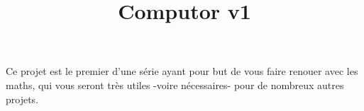 \documentclass{42}
\begin{document}
\title{Computor v1}
\subtitle{}


\summary
{

	Ce projet est le premier d'une série ayant pour but de vous faire renouer avec les maths, qui vous seront très utiles -voire nécessaires- pour de nombreux autres projets.
}

\maketitle

\tableofcontents



\graphicspath{{images/}}

\newpage
\end{document}
